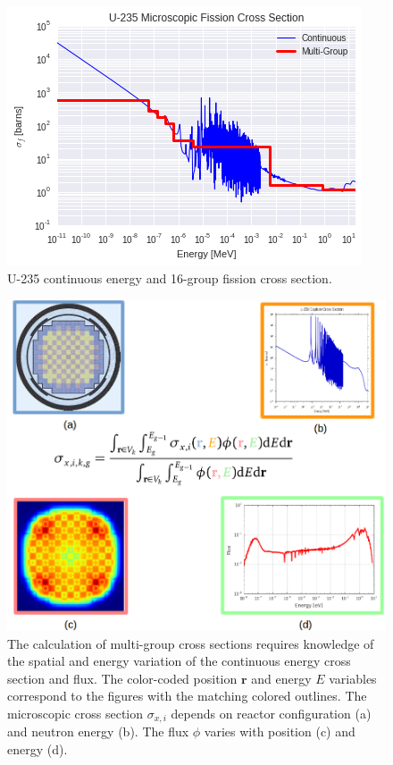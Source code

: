 \documentclass[12pt,twoside]{mitthesis-exec}
\begin{document}
\begin{figure}[h!]
\centering
\includegraphics[width=0.6\linewidth]{figures/intro/u235-ce-mg-xs}
\caption[U-235 continuous energy and multi-group fission cross section]{U-235 continuous energy and 16-group fission cross section.}
\label{fig:u235-sigf}
\end{figure}

\begin{figure}[h!]
\centering
\includegraphics[width=0.9\linewidth]{figures/mgxs/mgxs-overlay}
\caption[Energy and spatial variation in MGXS]{The calculation of multi-group cross sections requires knowledge of the spatial and energy variation of the continuous energy cross section and flux. The color-coded position $\mathbf{r}$ and energy $E$ variables correspond to the figures with the matching colored outlines. The microscopic cross section $\sigma_{x,i}$ depends on reactor configuration (a) and neutron energy (b). The flux $\phi$ varies with position (c) and energy (d).}
\label{fig:mgxs-overlay}
\end{figure}
\end{document}
